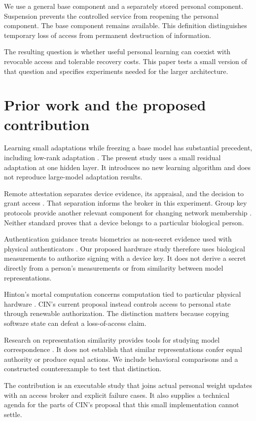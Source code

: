 \documentclass[11pt]{article}
\begin{document}
We use a general base component and a separately stored personal component.
Suspension prevents the controlled service from reopening the personal component.
The base component remains available.
This definition distinguishes temporary loss of access from permanent destruction of information.

The resulting question is whether useful personal learning can coexist with revocable access and tolerable recovery costs.
This paper tests a small version of that question and specifies experiments needed for the larger architecture.

\section{Prior work and the proposed contribution}
Learning small adaptations while freezing a base model has substantial precedent, including low-rank adaptation \cite{lora}.
The present study uses a small residual adaptation at one hidden layer.
It introduces no new learning algorithm and does not reproduce large-model adaptation results.

Remote attestation separates device evidence, its appraisal, and the decision to grant access \cite{rats}.
That separation informs the broker in this experiment.
Group key protocols provide another relevant component for changing network membership \cite{mls}.
Neither standard proves that a device belongs to a particular biological person.

Authentication guidance treats biometrics as non-secret evidence used with physical authenticators \cite{nistidentity}.
Our proposed hardware study therefore uses biological measurements to authorize signing with a device key.
It does not derive a secret directly from a person's measurements or from similarity between model representations.

Hinton's mortal computation concerns computation tied to particular physical hardware \cite{hinton}.
CIN's current proposal instead controls access to personal state through renewable authorization.
The distinction matters because copying software state can defeat a loss-of-access claim.

Research on representation similarity provides tools for studying model correspondence \cite{cka}.
It does not establish that similar representations confer equal authority or produce equal actions.
We include behavioral comparisons and a constructed counterexample to test that distinction.

The contribution is an executable study that joins actual personal weight updates with an access broker and explicit failure cases.
It also supplies a technical agenda for the parts of CIN's proposal that this small implementation cannot settle.
\end{document}
